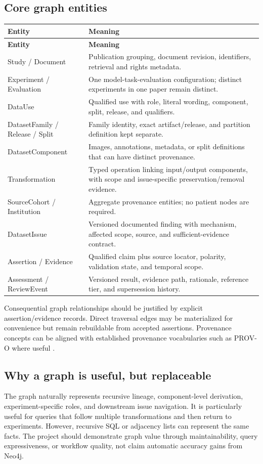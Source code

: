 \documentclass[11pt,a4paper]{article}
\begin{document}
\subsection{Core graph entities}
\begin{longtable}{@{}L{38mm}L{113mm}@{}}
\toprule
\textbf{Entity} & \textbf{Meaning}\\ \midrule
\endfirsthead
\toprule\textbf{Entity} & \textbf{Meaning}\\ \midrule\endhead
Study / Document & Publication grouping, document revision, identifiers, retrieval and rights metadata.\\
Experiment / Evaluation & One model-task-evaluation configuration; distinct experiments in one paper remain distinct.\\
DataUse & Qualified use with role, literal wording, component, split, release, and qualifiers.\\
DatasetFamily / Release / Split & Family identity, exact artifact/release, and partition definition kept separate.\\
DatasetComponent & Images, annotations, metadata, or split definitions that can have distinct provenance.\\
Transformation & Typed operation linking input/output components, with scope and issue-specific preservation/removal evidence.\\
SourceCohort / Institution & Aggregate provenance entities; no patient nodes are required.\\
DatasetIssue & Versioned documented finding with mechanism, affected scope, source, and sufficient-evidence contract.\\
Assertion / Evidence & Qualified claim plus source locator, polarity, validation state, and temporal scope.\\
Assessment / ReviewEvent & Versioned result, evidence path, rationale, reference tier, and supersession history.\\
\bottomrule
\end{longtable}

Consequential graph relationships should be justified by explicit assertion/evidence records. Direct traversal edges may be materialized for convenience but remain rebuildable from accepted assertions. Provenance concepts can be aligned with established provenance vocabularies such as PROV-O where useful \cite{provo}.

\subsection{Why a graph is useful, but replaceable}
The graph naturally represents recursive lineage, component-level derivation, experiment-specific roles, and downstream issue navigation. It is particularly useful for queries that follow multiple transformations and then return to experiments. However, recursive SQL or adjacency lists can represent the same facts. The project should demonstrate graph value through maintainability, query expressiveness, or workflow quality, not claim automatic accuracy gains from Neo4j.
\end{document}
